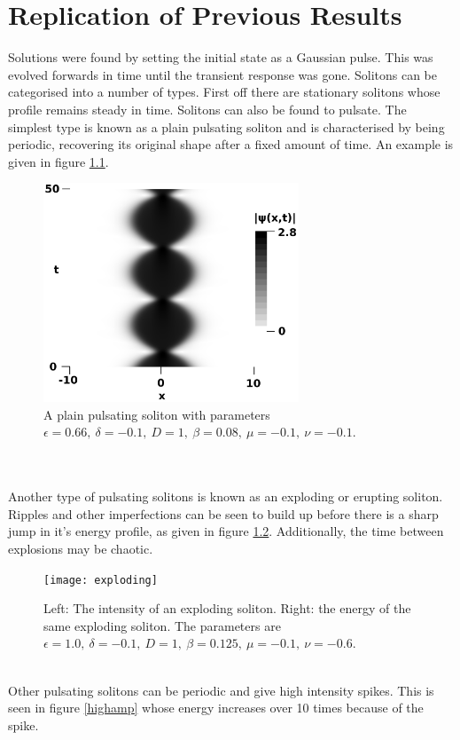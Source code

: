 \documentclass[a4paper,12pt]{report}
\begin{document}
\chapter{Replication of Previous Results}
Solutions were found by setting the initial state as a Gaussian pulse. This was evolved forwards in time until the transient response was gone. 
Solitons can be categorised into a number of types. First off there are stationary solitons whose profile remains steady in time. Solitons can also be found to pulsate. The simplest type is known as a plain pulsating soliton and is characterised by being periodic, recovering its original shape after a fixed amount of time. An example is given in figure \ref{plain}.\cite{2001}
\begin{figure}[h]
\centering
\includegraphics[width=3in]{plain}
\caption{A plain pulsating soliton with parameters $\epsilon=0.66,\ \delta=-0.1,\ D=1, \ \beta=0.08, \ \mu=-0.1,\ \nu=-0.1$. \cite{2001}}
\label{plain} 
\end{figure}
\\\\
Another type of pulsating solitons is known as an exploding or erupting soliton. Ripples and other imperfections can be seen to build up before there is a sharp jump in it's energy profile, as given in figure \ref{exploding}.  Additionally, the time between explosions may be chaotic. \cite{2001}%
\begin{figure}[h]
\hspace*{-1.4cm}
\texttt{[image: exploding]}
\caption{Left: The intensity of an exploding soliton. Right: the energy of the same exploding soliton. The parameters are $\epsilon=1.0,\ \delta=-0.1,\ D=1, \ \beta=0.125, \ \mu=-0.1,\ \nu=-0.6$.\cite{2001}}
\label{exploding} 
\end{figure}
\\
Other pulsating solitons can be periodic and give high intensity spikes. This is seen in figure \ref{highamp} whose energy increases over 10 times because of the spike. \cite{extreme}
\end{document}
